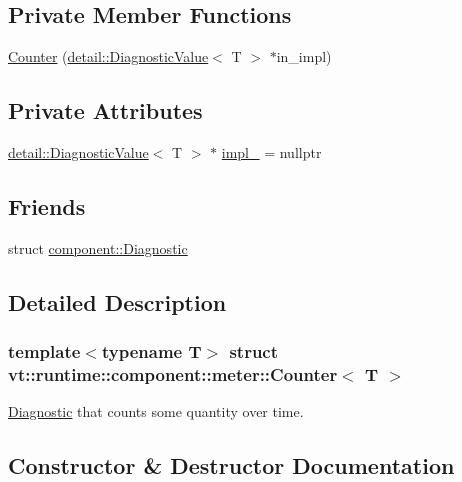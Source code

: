 \subsection*{Private Member Functions}
\begin{DoxyCompactItemize}
\item 
\hyperlink{structvt_1_1runtime_1_1component_1_1meter_1_1_counter_a649a29b69ce8db44fa9643820cd75080}{Counter} (\hyperlink{structvt_1_1runtime_1_1component_1_1detail_1_1_diagnostic_value}{detail\+::\+Diagnostic\+Value}$<$ T $>$ $\ast$in\+\_\+impl)
\end{DoxyCompactItemize}
\subsection*{Private Attributes}
\begin{DoxyCompactItemize}
\item 
\hyperlink{structvt_1_1runtime_1_1component_1_1detail_1_1_diagnostic_value}{detail\+::\+Diagnostic\+Value}$<$ T $>$ $\ast$ \hyperlink{structvt_1_1runtime_1_1component_1_1meter_1_1_counter_a2e2b0b2a78c95c3017a571bd76310eba}{impl\+\_\+} = nullptr
\end{DoxyCompactItemize}
\subsection*{Friends}
\begin{DoxyCompactItemize}
\item 
struct \hyperlink{structvt_1_1runtime_1_1component_1_1meter_1_1_counter_a48f263de9dbf26c1fc7736031cca9613}{component\+::\+Diagnostic}
\end{DoxyCompactItemize}


\subsection{Detailed Description}
\subsubsection*{template$<$typename T$>$\newline
struct vt\+::runtime\+::component\+::meter\+::\+Counter$<$ T $>$}

\hyperlink{structvt_1_1runtime_1_1component_1_1_diagnostic}{Diagnostic} that counts some quantity over time. 

\subsection{Constructor \& Destructor Documentation}
\mbox{\label{structvt_1_1runtime_1_1component_1_1meter_1_1_counter_afbe8191f66fc515812ee5bf1b5d857a8}} 
